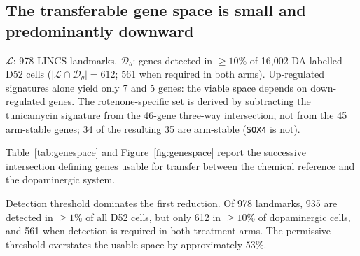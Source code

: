 \documentclass[5p,times,twocolumn]{elsarticle}
\begin{document}
\subsection{\textbf{The transferable gene space is small and predominantly downward}}

\begin{table}[!htbp]
  \centering
  \caption{Transferable gene space: successive intersection sizes.}
  \label{tab:genespace}
  \begin{minipage}{\linewidth}\footnotesize
  $\mathcal{L}$: 978 LINCS landmarks. $\mathcal{D}_\theta$: genes detected in $\geq 10\%$ of 16{,}002 DA-labelled D52 cells ($|\mathcal{L}\cap\mathcal{D}_\theta| = 612$; 561 when required in both arms). Up-regulated signatures alone yield only 7 and 5 genes: the viable space depends on down-regulated genes. The rotenone-specific set is derived by subtracting the tunicamycin signature from the 46-gene three-way intersection, not from the 45 arm-stable genes; 34 of the resulting 35 are arm-stable (\texttt{SOX4} is not).
  \end{minipage}
\end{table}



Table~\ref{tab:genespace} and Figure~\ref{fig:genespace} report the successive
intersection defining genes usable for transfer between the chemical reference
and the dopaminergic system.

Detection threshold dominates the first reduction. Of 978 landmarks, 935 are
detected in $\geq 1\%$ of all D52 cells, but only 612 in $\geq 10\%$ of
dopaminergic cells, and 561 when detection is required in both treatment arms.
The permissive threshold overstates the usable space by approximately $53\%$.
\end{document}
